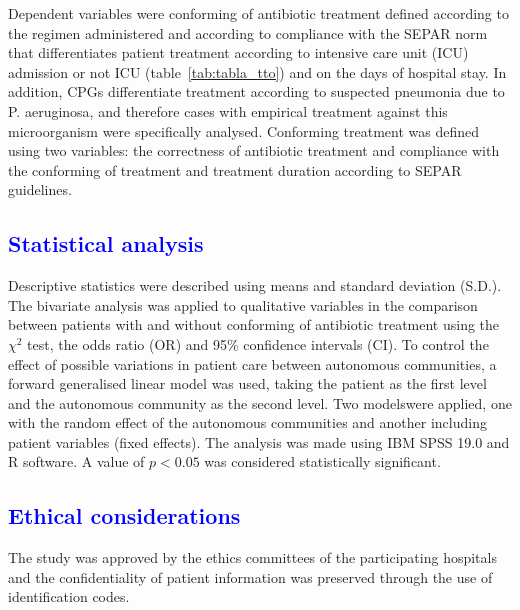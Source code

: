 \documentclass[11pt, a4paper]{article}
\begin{document}
\begin{multicols}{2}
Dependent variables were conforming of antibiotic treatment defined according to the regimen administered and according to compliance with the SEPAR \cite{menendez2010neumonia} norm that differentiates patient treatment according to intensive care unit (ICU) admission or not ICU (table~\ref{tab:tabla_tto}) and on the days of hospital stay. In addition, CPGs differentiate treatment according to suspected pneumonia due to P. aeruginosa, and therefore cases with empirical treatment against this microorganism were specifically analysed. Conforming treatment was defined using two variables: the correctness of antibiotic treatment and compliance with the conforming of treatment and treatment duration according to SEPAR guidelines.

\subsection*{\textcolor{blue}{Statistical analysis}}
Descriptive statistics were described using means and standard deviation (S.D.). The bivariate analysis was applied to qualitative variables in the comparison between patients with and without conforming of antibiotic treatment using the $\chi^{2}$ test, the odds ratio (OR) and 95\% confidence intervals (CI). To control the effect of possible variations in patient care between autonomous communities, a forward generalised linear model was used, taking the patient as the first level and the autonomous community as the second level. Two modelswere applied, one with the random effect of the autonomous communities and another including patient variables (fixed effects). The analysis was made using IBM SPSS 19.0 and R
software. A value of $p< 0.05$ was considered statistically significant.

\subsection*{\textcolor{blue}{Ethical considerations}}
The study was approved by the ethics committees of the participating hospitals and the confidentiality of patient information was preserved through the use of identification codes.
\end{multicols}
\end{document}
